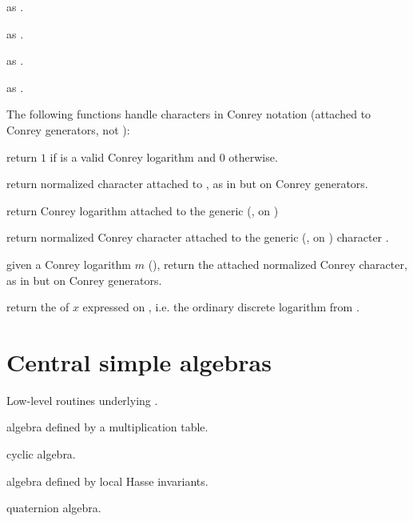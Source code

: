  as .

 as .

 as .

 as .

The following functions handle characters in Conrey notation (attached to
Conrey generators, not ):

 return $1$ if  is
a valid Conrey logarithm and $0$ otherwise.

 return normalized character
attached to , as in  but on Conrey generators.

 return Conrey logarithm
attached to the generic (, on )

 return normalized
Conrey character attached to the generic (, on )
character .

 given a Conrey logarithm $m$
(), return the attached normalized Conrey character, as in
 but on Conrey generators.

 return the  of $x$
expressed on , i.e. the ordinary discrete logarithm
from .

\section{Central simple algebras}


Low-level routines underlying .

algebra defined by a multiplication table.

cyclic algebra.

algebra defined by local Hasse invariants.

quaternion algebra.


